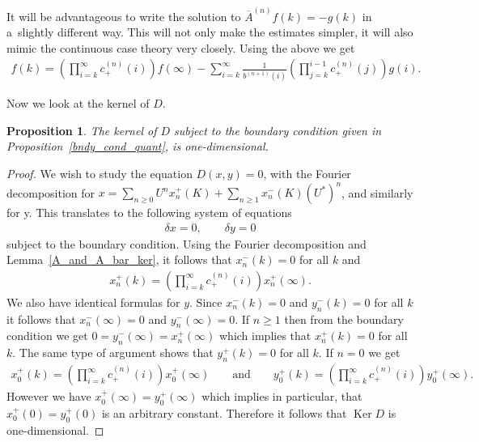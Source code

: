 \documentclass[11pt]{article}
\numberwithin{equation}{section}
\newtheorem{prop}[theo]{Proposition}
{\theoremstyle{definition}
\newtheorem{rem}[theo]{Remark}
\newtheorem{defin}[theo]{Definition}
}
\DeclareMathOperator{\Ker}{Ker}
\begin{document}
It will be advantageous to write the solution to $\overline{A}^{(n)}f(k) = -g(k)$ in a~slightly dif\/ferent way.
This will not only make the estimates simpler, it will also mimic the continuous case theory very closely.
Using the above we get
\begin{gather*}
f(k) = \left(\prod\limits_{i=k}^\infty c_+^{(n)}(i)\right)f(\infty) - \sum\limits_{i=k}^\infty
\frac{1}{b^{(n+1)}(i)}\left(\prod\limits_{j=k}^{i-1}c_+^{(n)}(j)\right)g(i).
\end{gather*}

Now we look at the kernel of $D$.

\begin{prop}
The kernel of $D$ subject to the boundary condition given in Proposition~{\rm \ref{bndy_cond_quant}}, is one-dimensional.
\end{prop}

\begin{proof}
We wish to study the equation $D(x,y) = 0$, with the Fourier decomposition for $x= \sum\limits_{n\ge0} U^n x_n^+(K) +
\sum\limits_{n\ge1} x_n^-(K)(U^*)^n$, and similarly for y.
This translates to the following system of equations
\begin{gather*}
\delta x = 0,
\qquad
\delta y = 0
\end{gather*}
subject to the boundary condition.
Using the Fourier decomposition and Lemma~\ref{A_and_A_bar_ker}, it follows that $x_n^-(k) = 0$ for all $k$ and
\begin{gather*}
x_n^+(k) = \left(\prod\limits_{i=k}^\infty c_+^{(n)}(i)\right)x_n^+(\infty).
\end{gather*}
We also have identical formulas for $y$.
Since $x_n^-(k) = 0$ and $y_n^-(k) = 0$ for all $k$ it follows that $x_n^-(\infty)=0$ and $y_n^-(\infty)= 0$.
If $n\ge1$ then from the boundary condition we get $0 = y_n^-(\infty) = x_n^+(\infty)$ which implies that $x_n^+(k)=0$
for all $k$.
The same type of argument shows that $y_n^+(k)=0$ for all $k$.
If $n=0$ we get
\begin{gather*}
x_0^+(k) = \left(\prod\limits_{i=k}^\infty c_+^{(n)}(i)\right)x_0^+(\infty)
\qquad
\textrm{and}
\qquad
y_0^+(k) = \left(\prod\limits_{i=k}^\infty c_+^{(n)}(i)\right)y_0^+(\infty).
\end{gather*}
However we have $x_0^+(\infty) = y_0^+(\infty)$ which implies in particular, that $x_0^+(0) = y_0^+(0)$ is an arbitrary
constant.
Therefore it follows that $\Ker D$ is one-dimensional.
\end{proof}
\end{document}
